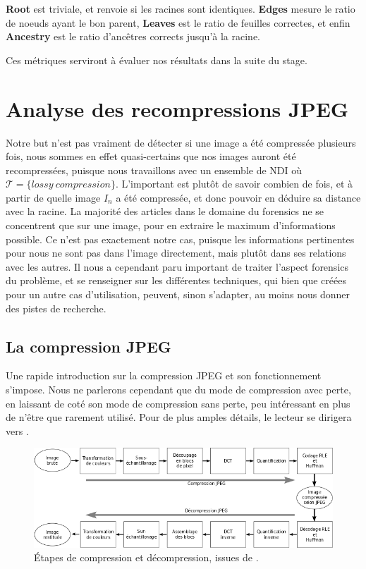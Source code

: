 \documentclass[utf8,final]{stageM2R} %
\begin{document}
\textbf{Root} est triviale, et renvoie si les racines sont identiques. \textbf{Edges} mesure le ratio de noeuds ayant le bon parent, \textbf{Leaves} est le ratio de feuilles correctes, et enfin \textbf{Ancestry} est le ratio d'ancêtres corrects jusqu'à la racine.

Ces métriques serviront à évaluer nos résultats dans la suite du stage.

\section{Analyse des recompressions JPEG}
\label{detail_jpeg}
Notre but n'est pas vraiment de détecter si une image a été compressée plusieurs fois, nous sommes en effet quasi-certains que nos images auront été recompressées, puisque nous travaillons avec un ensemble de NDI où $\mathcal{T} = {\{lossy\ compression\}}$. L'important est plutôt de savoir combien de fois, et à partir de quelle image $I_{n}$ a été compressée, et donc pouvoir en déduire sa distance avec la racine. La majorité des articles dans le domaine du forensics ne se concentrent que sur une image, pour en extraire le maximum d'informations possible. Ce n'est pas exactement notre cas, puisque les informations pertinentes pour nous ne sont pas dans l'image directement, mais plutôt dans ses relations avec les autres. Il nous a cependant paru important de traiter l'aspect forensics du problème, et se renseigner sur les différentes techniques, qui bien que créées pour un autre cas d'utilisation, peuvent, sinon s'adapter, au moins nous donner des pistes de recherche.

\subsection{La compression JPEG}
Une rapide introduction sur la compression JPEG et son fonctionnement s'impose. Nous ne parlerons cependant que du mode de compression avec perte, en laissant de coté son mode de compression sans perte, peu intéressant en plus de n'être que rarement utilisé. Pour de plus amples détails, le lecteur se dirigera vers \autocite{wallace1992jpeg}.

\begin{figure}[H]
  \begin{center}
    \includegraphics[width=120mm]{images/jpeg.png}
    \caption{Étapes de compression et décompression, issues de \autocite{jpeg}.}
    \label{fig:jpeg}
  \end{center}
\end{figure}
\end{document}
